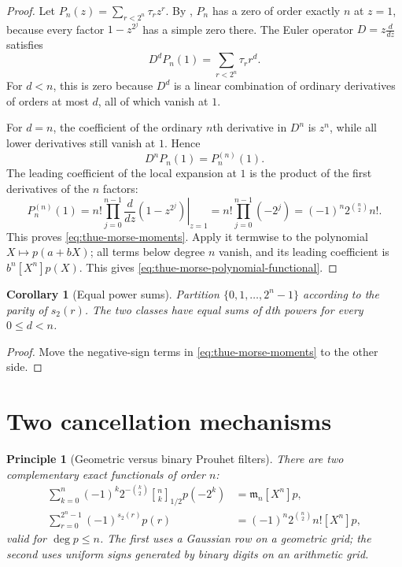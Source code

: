 \documentclass[11pt,oneside,openany]{book}
\newtheorem{corollary}[corollary]{Corollary}
\newtheorem{principle}[principle]{Principle}
\theoremstyle{definition}
\theoremstyle{remark}
\newcommand{\Qbinom}[3]{\genfrac{[}{]}{0pt}{}{#1}{#2}_{#3}}
\begin{document}
\begin{proof}
Let
$P_n(z)=\sum_{r<2^n}\tau_rz^r$.  By , $P_n$ has a zero of order exactly $n$ at $z=1$, because every factor $1-z^{2^j}$ has a simple zero there.  The Euler operator $D=z\frac{d}{dz}$ satisfies
\[
 D^dP_n(1)=\sum_{r<2^n}\tau_rr^d.
\]
For $d<n$, this is zero because $D^d$ is a linear combination of ordinary derivatives of orders at most $d$, all of which vanish at $1$.

For $d=n$, the coefficient of the ordinary $n$th derivative in $D^n$ is $z^n$, while all lower derivatives still vanish at $1$.  Hence
\[
 D^nP_n(1)=P_n^{(n)}(1).
\]
The leading coefficient of the local expansion at $1$ is the product of the first derivatives of the $n$ factors:
\[
 P_n^{(n)}(1)
 =n!\prod_{j=0}^{n-1}\left.\frac{d}{dz}(1-z^{2^j})\right|_{z=1}
 =n!\prod_{j=0}^{n-1}(-2^j)
 =(-1)^n2^{\binom n2}n!.
\]
This proves \eqref{eq:thue-morse-moments}.  Apply it termwise to the polynomial $X\mapsto p(a+bX)$; all terms below degree $n$ vanish, and its leading coefficient is $b^n[X^n]p(X)$.  This gives \eqref{eq:thue-morse-polynomial-functional}.
\end{proof}

\begin{corollary}[Equal power sums]\label{cor:thue-morse-prouhet-partition}
Partition $\{0,1,\ldots,2^n-1\}$ according to the parity of $s_2(r)$.  The two classes have equal sums of $d$th powers for every $0\le d<n$.
\end{corollary}

\begin{proof}
Move the negative-sign terms in \eqref{eq:thue-morse-moments} to the other side.
\end{proof}

\section{Two cancellation mechanisms}

\begin{principle}[Geometric versus binary Prouhet filters]\label{prin:two-prouhet-filters}
There are two complementary exact functionals of order $n$:
\begin{align*}
 \sum_{k=0}^{n}(-1)^k2^{-\binom k2}\Qbinom nk{1/2}p(-2^k)
 &=\mathfrak m_n[X^n]p,\\
 \sum_{r=0}^{2^n-1}(-1)^{s_2(r)}p(r)
 &=(-1)^n2^{\binom n2}n![X^n]p,
\end{align*}
valid for $\deg p\le n$.  The first uses a Gaussian row on a geometric grid; the second uses uniform signs generated by binary digits on an arithmetic grid.
\end{principle}
\end{document}
